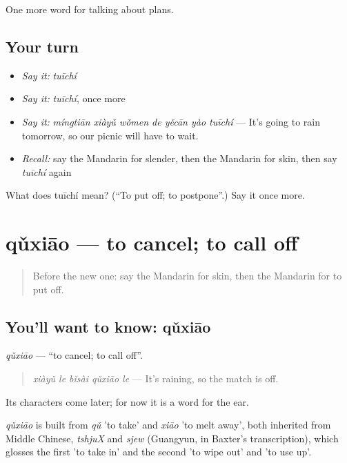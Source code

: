 \begin{grammarlens}[title={What you've built}]
One more word for talking about plans.
\end{grammarlens}

\subsection*{Your turn}
\begin{itemize}
\raggedright
  \item \emph{Say it:} \emph{tuīchí}
  \item \emph{Say it:} \emph{tuīchí}, once more
  \item \emph{Say it:} \emph{míngtiān xiàyǔ wǒmen de yěcān yào tuīchí} — It's going to rain tomorrow, so our picnic will have to wait.
  \item \emph{Recall:} say the Mandarin for slender, then the Mandarin for skin, then say \emph{tuīchí} again
\end{itemize}

\begin{tcolorbox}[breakable,colback=teal!4,colframe=teal!35!black,title={Before you move on}]
What does tuīchí mean? (\textquotedblleft{}To put off; to postpone\textquotedblright{}.) Say it once more.
\end{tcolorbox}
\section[qǔxiāo]{qǔxiāo — to cancel; to call off}

\label{lesson:ZH-C234-quxiao}



\begin{quote}
Before the new one: say the Mandarin for skin, then the Mandarin for to put off.
\end{quote}

\subsection*{You'll want to know: qǔxiāo}
\emph{qǔxiāo} — \textquotedblleft{}to cancel; to call off\textquotedblright{}.

\begin{quote}
\emph{xiàyǔ le bǐsài qǔxiāo le} — It's raining, so the match is off.
\end{quote}

Its characters come later; for now it is a word for the ear.

\begin{cousinweb}
\emph{qǔxiāo} is built from \emph{qǔ} 'to take' and \emph{xiāo} 'to melt away', both inherited from Middle Chinese, \emph{tshjuX} and \emph{sjew} (Guangyun, in Baxter's transcription), which glosses the first 'to take in' and the second 'to wipe out' and 'to use up'.
\end{cousinweb}


